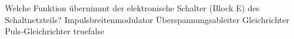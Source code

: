     {Welche Funktion übernimmt der elektronische Schalter (Block E) des Schaltnetzteils?}
    {Impulsbreitenmodulator}
    {Überspannungsableiter}
    {Gleichrichter}
    {Puls-Gleichrichter}
    {true}{false}